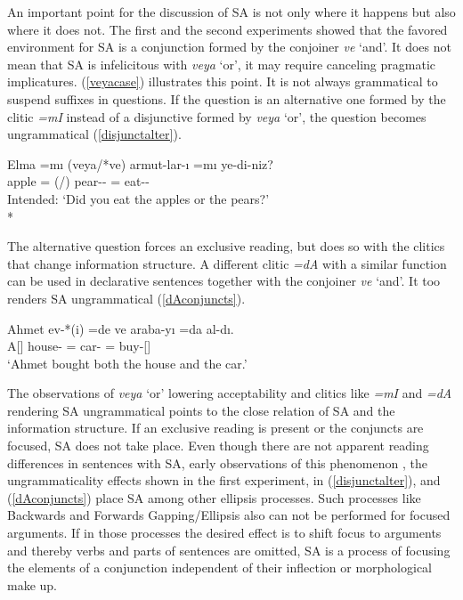 An important point for the discussion of SA is not only where it happens but also where it does not. The first and the second experiments showed that the favored environment for SA is a conjunction formed by the conjoiner \textit{ve} `and'. It does not mean that SA is infelicitous with \textit{veya} `or', it may require canceling pragmatic implicatures. (\ref{veyacase}) illustrates this point. It is not always grammatical to suspend suffixes in questions. If the question is an alternative one formed by the clitic \textit{=mI} instead of a disjunctive formed by \textit{veya} `or', the question becomes ungrammatical (\ref{disjunctalter}).

\begin{exe}
    \ex \label{disjunctalter}
    \gll *Elma =mı (veya/*ve) armut-lar-ı =mı ye-di-niz? \\ 
    apple ={\Q} (\Or/\And) pear-{\Pl}-{\Acc} ={\Q} eat-{\Pst}-{\Spl}  \\
    \glt Intended: `Did you eat the apples or the pears?' \\*
\end{exe}

The alternative question forces an exclusive reading, but does so with the clitics that change information structure. A different clitic \textit{=dA} with a similar function can be used in declarative sentences together with the conjoiner \textit{ve} `and'. It too renders SA ungrammatical (\ref{dAconjuncts}).

\begin{exe}
    \ex \label{dAconjuncts} 
    \gll Ahmet ev-*(i) =de ve araba-yı =da al-dı. \\ A[{\Nom}] 
    house-{\Acc} ={\Foc} {\And} car-{\Acc} ={\Foc} buy-{\Pst}[{\Tsg}] \\
    \glt `Ahmet bought both the house and the car.'
\end{exe}

The observations of \textit{veya} `or' lowering acceptability and clitics like \textit{=mI} and \textit{=dA} rendering SA ungrammatical points to the close relation of SA and the information structure. If an exclusive reading is present or the conjuncts are focused, SA does not take place. Even though there are not apparent reading differences in sentences with SA, early observations of this phenomenon \citep{emre1945turk}, the ungrammaticality effects shown in the first experiment, in (\ref{disjunctalter}), and (\ref{dAconjuncts}) place SA among other ellipsis processes. Such processes like Backwards and Forwards Gapping/Ellipsis also can not be performed for focused arguments. If in those processes the desired effect is to shift focus to arguments and thereby verbs and parts of sentences are omitted, SA is a process of focusing the elements of a conjunction independent of their inflection or morphological make up.

